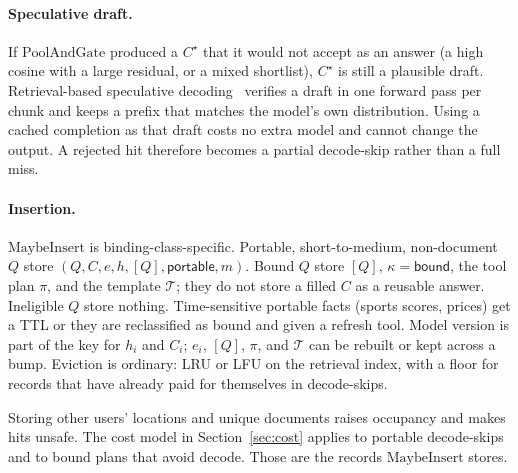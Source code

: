 \paragraph{Speculative draft.}
If $\mathrm{PoolAndGate}$ produced a $C^\star$ that it would not accept as an answer (a high cosine with a large residual, or a mixed shortlist), $C^\star$ is still a plausible draft. Retrieval-based speculative decoding~\citep{he2024rest,leviathan2023fast} verifies a draft in one forward pass per chunk and keeps a prefix that matches the model's own distribution. Using a cached completion as that draft costs no extra model and cannot change the output. A rejected hit therefore becomes a partial decode-skip rather than a full miss.

\paragraph{Insertion.}
$\mathrm{MaybeInsert}$ is binding-class-specific. Portable, short-to-medium, non-document $Q$ store $(Q,C,e,h,[Q],\mathsf{portable},m)$. Bound $Q$ store $[Q]$, $\kappa=\mathsf{bound}$, the tool plan $\pi$, and the template $\mathcal{T}$; they do not store a filled $C$ as a reusable answer. Ineligible $Q$ store nothing. Time-sensitive portable facts (sports scores, prices) get a TTL or they are reclassified as bound and given a refresh tool. Model version is part of the key for $h_i$ and $C_i$; $e_i$, $[Q]$, $\pi$, and $\mathcal{T}$ can be rebuilt or kept across a bump. Eviction is ordinary: LRU or LFU on the retrieval index, with a floor for records that have already paid for themselves in decode-skips.

Storing other users' locations and unique documents raises occupancy and makes hits unsafe. The cost model in Section~\ref{sec:cost} applies to portable decode-skips and to bound plans that avoid decode. Those are the records $\mathrm{MaybeInsert}$ stores.
